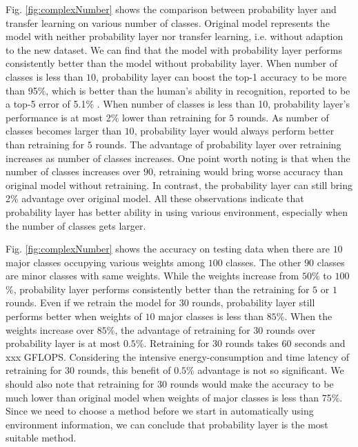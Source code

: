 \documentclass{article}
\begin{document}
Fig. \ref{fig:complexNumber} shows the comparison between probability layer and transfer learning on various number of classes. Original model represents the model with neither probability layer nor transfer learning, i.e. without adaption to the new dataset. We can find that the model with probability layer performs consistently better than the model without probability layer. When number of classes is less than $10$, probability layer can boost the top-1 accuracy to be more than 95\%, which is better than the human's ability in recognition, reported to be a top-5 error of 5.1\% \cite{russakovsky2015imagenet}. When number of classes is less than 10, probability layer's performance is at most 2\% lower than retraining for $5$ rounds. As number of classes becomes larger than $10$, probability layer would always perform better than retraining for $5$ rounds. The advantage of probability layer over retraining increases as number of classes increases. One point worth noting is that when the number of classes increases over $90$, retraining would bring worse accuracy than original model without retraining. In contrast, the probability layer can still bring 2\% advantage over original model. All these observations indicate that probability layer has better ability in using various environment, especially when the number of classes gets larger.

Fig. \ref{fig:complexNumber} shows the accuracy on testing data when there are $10$ major classes occupying various weights among $100$ classes. The other $90$ classes are minor classes with same weights. While the weights increase from $50$\% to $100$\%, probability layer performs consistently better than the retraining for $5$ or $1$ rounds. Even if we retrain the model for $30$ rounds, probability layer still performs better when weights of $10$ major classes is less than $85$\%. When the weights increase over $85$\%, the advantage of retraining for $30$ rounds over probability layer is at most $0.5$\%. Retraining for $30$ rounds takes $60$ seconds and xxx GFLOPS. Considering the intensive energy-consumption and time latency of retraining for $30$ rounds, this benefit of $0.5$\% advantage is not so significant. We should also note that retraining for $30$ rounds would make the accuracy to be much lower than original model when weights of major classes is less than 75\%. Since we need to choose a method before we start in automatically using environment information, we can conclude that probability layer is the most suitable method.
\end{document}
